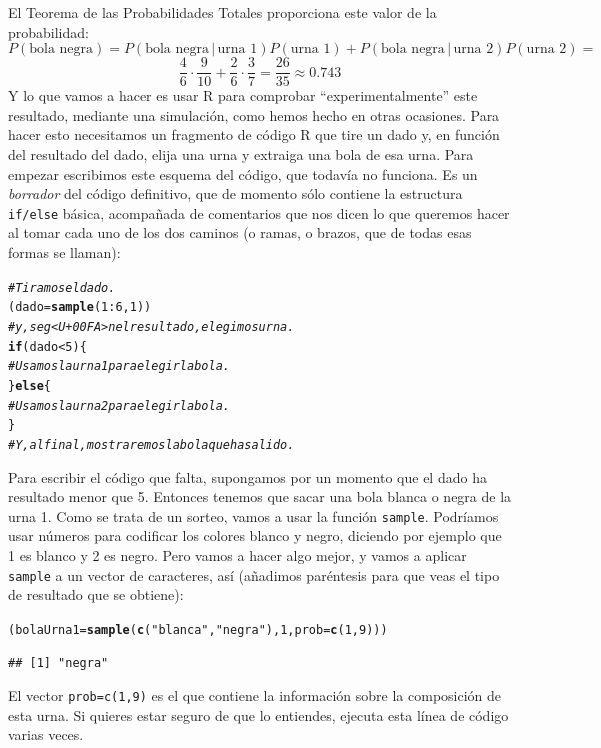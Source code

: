 \documentclass[10pt,a4paper]{article}\usepackage[]{graphicx}\usepackage[]{color}
\makeatletter
\newcommand{\hlnum}[1]{\textcolor[rgb]{0.686,0.059,0.569}{#1}}%
\newcommand{\hlstr}[1]{\textcolor[rgb]{0.192,0.494,0.8}{#1}}%
\newcommand{\hlcom}[1]{\textcolor[rgb]{0.678,0.584,0.686}{\textit{#1}}}%
\newcommand{\hlopt}[1]{\textcolor[rgb]{0,0,0}{#1}}%
\newcommand{\hlstd}[1]{\textcolor[rgb]{0.345,0.345,0.345}{#1}}%
\newcommand{\hlkwa}[1]{\textcolor[rgb]{0.161,0.373,0.58}{\textbf{#1}}}%
\newcommand{\hlkwb}[1]{\textcolor[rgb]{0.69,0.353,0.396}{#1}}%
\newcommand{\hlkwc}[1]{\textcolor[rgb]{0.333,0.667,0.333}{#1}}%
\newcommand{\hlkwd}[1]{\textcolor[rgb]{0.737,0.353,0.396}{\textbf{#1}}}%
\newenvironment{kframe}{%
 \def\at@end@of@kframe{}%
 \ifinner\ifhmode%
  \def\at@end@of@kframe{\end{minipage}}%
  \begin{minipage}{\columnwidth}%
 \fi\fi%
 \def\FrameCommand##1{\hskip\@totalleftmargin \hskip-\fboxsep
 \colorbox{shadecolor}{##1}\hskip-\fboxsep
     \hskip-\linewidth \hskip-\@totalleftmargin \hskip\columnwidth}%
 \MakeFramed {\advance\hsize-\width
   \@totalleftmargin\z@ \linewidth\hsize
   \@setminipage}}%
 {\par\unskip\endMakeFramed%
 \at@end@of@kframe}
\newenvironment{knitrout}{}{} %
\newcounter {cont01}
\makeatother
\begin{document}
El Teorema de las Probabilidades Totales proporciona este valor de la probabilidad:
\[P(\mbox{bola negra})=P(\mbox{bola negra}\,|\,\mbox{urna 1})P(\mbox{urna 1})+P(\mbox{bola negra}\,|\,\mbox{urna 2})P(\mbox{urna 2})=\]
\[\dfrac{4}{6}\cdot\dfrac{9}{10}+\dfrac{2}{6}\cdot\dfrac{3}{7}=\dfrac{26}{35}\approx 0.743\]
Y lo que vamos a hacer es usar R para comprobar ``experimentalmente'' este resultado, mediante una simulación, como hemos hecho en otras ocasiones. Para hacer esto necesitamos un fragmento de código R que tire un dado y, en función del resultado del dado, elija una urna y extraiga una bola de esa urna. Para empezar escribimos este esquema del código, que todavía no funciona. Es un {\em borrador} del código definitivo, que de momento sólo contiene la estructura {\tt if/else} básica, acompañada de comentarios que nos dicen lo que queremos hacer al tomar cada uno de los dos caminos (o ramas, o brazos, que de todas esas formas se llaman):
\begin{knitrout}
\color{fgcolor}\begin{kframe}
\begin{alltt}
    \hlcom{# Tiramos el dado.}
    \hlstd{(dado} \hlkwb{=} \hlkwd{sample}\hlstd{(}\hlnum{1}\hlopt{:}\hlnum{6}\hlstd{,}\hlnum{1}\hlstd{))}
    \hlcom{# y, seg<U+00FA>n el resultado, elegimos urna.}
    \hlkwa{if}\hlstd{(dado} \hlopt{<} \hlnum{5}\hlstd{)\{}
        \hlcom{# Usamos la urna 1 para elegir la bola.}
    \hlstd{\}} \hlkwa{else} \hlstd{\{}
        \hlcom{# Usamos la urna 2 para elegir la bola.}
    \hlstd{\}}
    \hlcom{# Y, al final, mostraremos la bola que ha salido.}
\end{alltt}
\end{kframe}
\end{knitrout}
Para escribir el código que falta, supongamos por un momento que el dado ha resultado menor que 5. Entonces tenemos que sacar una bola blanca o negra de la urna 1. Como se trata de un sorteo, vamos a usar la función {\tt sample}. Podríamos usar números para codificar los colores blanco y negro, diciendo por ejemplo que 1 es blanco y 2 es negro. Pero vamos a hacer algo mejor, y vamos a aplicar {\tt sample} a un vector de caracteres, así (añadimos paréntesis para que veas el tipo de resultado que se obtiene):
\begin{knitrout}
\color{fgcolor}\begin{kframe}
\begin{alltt}
\hlstd{(bolaUrna1} \hlkwb{=} \hlkwd{sample}\hlstd{(} \hlkwd{c}\hlstd{(}\hlstr{"blanca"}\hlstd{,}\hlstr{"negra"}\hlstd{),} \hlnum{1}\hlstd{,} \hlkwc{prob}\hlstd{=}\hlkwd{c}\hlstd{(}\hlnum{1}\hlstd{,}\hlnum{9}\hlstd{) ))}
\end{alltt}
\begin{verbatim}
## [1] "negra"
\end{verbatim}
\end{kframe}
\end{knitrout}
El vector {\tt prob=c(1,9)} es el que contiene la información sobre la composición de esta urna. Si quieres estar seguro de que lo entiendes,  ejecuta esta línea de código varias veces.
\end{document}
